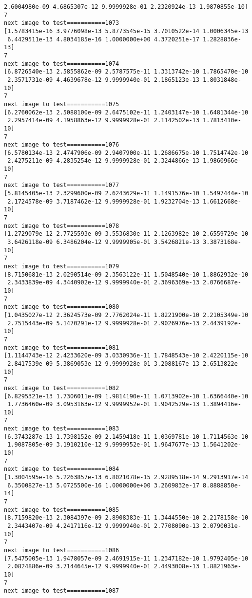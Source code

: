 \documentclass[11pt]{article}
\begin{document}
\begin{Verbatim}[commandchars=\\\{\}]
 2.6004980e-09 4.6865307e-12 9.9999928e-01 2.2320924e-13 1.9870855e-10]
7
next image to test===========1073
[1.5783415e-16 3.9776098e-13 5.8773545e-15 3.7010522e-14 1.0006345e-13
 6.4429511e-13 4.8034185e-16 1.0000000e+00 4.3720251e-17 1.2828836e-13]
7
next image to test===========1074
[6.8726540e-13 2.5855862e-09 2.5787575e-11 1.3313742e-10 1.7865470e-10
 2.3571731e-09 4.4639678e-12 9.9999940e-01 2.1865123e-13 1.8031848e-10]
7
next image to test===========1075
[6.2760062e-13 2.5088100e-09 2.6475102e-11 1.2403147e-10 1.6481344e-10
 2.2957414e-09 4.1958863e-12 9.9999928e-01 2.1142502e-13 1.7813410e-10]
7
next image to test===========1076
[6.5780134e-13 2.4747906e-09 2.9407900e-11 1.2686675e-10 1.7514742e-10
 2.4275211e-09 4.2835254e-12 9.9999928e-01 2.3244866e-13 1.9860966e-10]
7
next image to test===========1077
[5.8145405e-13 2.3299600e-09 2.6243629e-11 1.1491576e-10 1.5497444e-10
 2.1724578e-09 3.7187462e-12 9.9999928e-01 1.9232704e-13 1.6612668e-10]
7
next image to test===========1078
[1.2729079e-12 2.7725593e-09 3.5536830e-11 2.1263982e-10 2.6559729e-10
 3.6426118e-09 6.3486204e-12 9.9999905e-01 3.5426821e-13 3.3873168e-10]
7
next image to test===========1079
[8.7150681e-13 2.0290514e-09 2.3563122e-11 1.5048540e-10 1.8862932e-10
 2.3433839e-09 4.3440902e-12 9.9999940e-01 2.3696369e-13 2.0766687e-10]
7
next image to test===========1080
[1.0435027e-12 2.3624573e-09 2.7762024e-11 1.8221900e-10 2.2105349e-10
 2.7515443e-09 5.1470291e-12 9.9999928e-01 2.9026976e-13 2.4439192e-10]
7
next image to test===========1081
[1.1144743e-12 2.4233620e-09 3.0330936e-11 1.7848543e-10 2.4220115e-10
 2.8417539e-09 5.3869053e-12 9.9999928e-01 3.2088167e-13 2.6513822e-10]
7
next image to test===========1082
[6.8295321e-13 1.7306011e-09 1.9814190e-11 1.0713902e-10 1.6366440e-10
 1.7736460e-09 3.0953163e-12 9.9999952e-01 1.9042529e-13 1.3894416e-10]
7
next image to test===========1083
[6.3743287e-13 1.7398152e-09 2.1459418e-11 1.0369781e-10 1.7114563e-10
 1.9087805e-09 3.1910210e-12 9.9999952e-01 1.9647677e-13 1.5641202e-10]
7
next image to test===========1084
[1.3004595e-16 5.2263857e-13 6.8021078e-15 2.9289518e-14 9.2913917e-14
 6.3500827e-13 5.0725500e-16 1.0000000e+00 3.2609832e-17 8.8888850e-14]
7
next image to test===========1085
[8.7159820e-13 2.3084397e-09 2.8908383e-11 1.3444550e-10 2.2178158e-10
 2.3443407e-09 4.2417116e-12 9.9999940e-01 2.7708090e-13 2.0790031e-10]
7
next image to test===========1086
[7.5475005e-13 1.9478057e-09 2.4691915e-11 1.2347182e-10 1.9792405e-10
 2.0824886e-09 3.7144645e-12 9.9999940e-01 2.4493008e-13 1.8821963e-10]
7
next image to test===========1087

\end{Verbatim}
\end{document}
